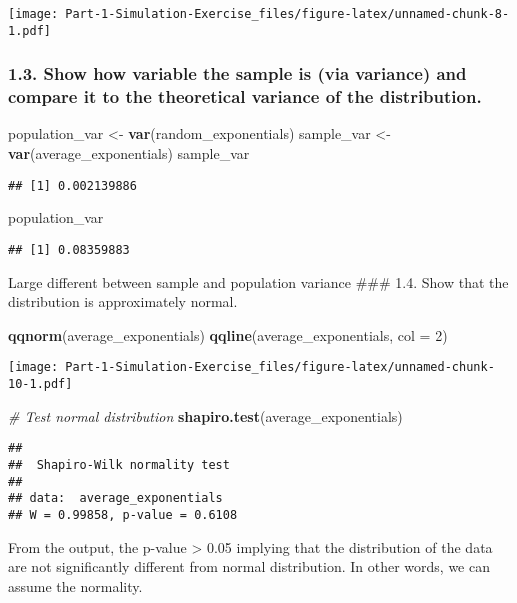 \documentclass[]{article}
\newenvironment{Shaded}{\begin{snugshade}}{\end{snugshade}}
\newcommand{\KeywordTok}[1]{\textcolor[rgb]{0.13,0.29,0.53}{\textbf{#1}}}
\newcommand{\DataTypeTok}[1]{\textcolor[rgb]{0.13,0.29,0.53}{#1}}
\newcommand{\DecValTok}[1]{\textcolor[rgb]{0.00,0.00,0.81}{#1}}
\newcommand{\StringTok}[1]{\textcolor[rgb]{0.31,0.60,0.02}{#1}}
\newcommand{\CommentTok}[1]{\textcolor[rgb]{0.56,0.35,0.01}{\textit{#1}}}
\newcommand{\NormalTok}[1]{#1}
\begin{document}
\texttt{[image: Part-1-Simulation-Exercise\_files/figure-latex/unnamed-chunk-8-1.pdf]}

\subsubsection{1.3. Show how variable the sample is (via variance) and
compare it to the theoretical variance of the
distribution.}\label{show-how-variable-the-sample-is-via-variance-and-compare-it-to-the-theoretical-variance-of-the-distribution.}

\begin{Shaded}
\begin{Highlighting}[]
\NormalTok{population_var <-}\StringTok{ }\KeywordTok{var}\NormalTok{(random_exponentials)}
\NormalTok{sample_var <-}\StringTok{ }\KeywordTok{var}\NormalTok{(average_exponentials)}
\NormalTok{sample_var}
\end{Highlighting}
\end{Shaded}

\begin{verbatim}
## [1] 0.002139886
\end{verbatim}

\begin{Shaded}
\begin{Highlighting}[]
\NormalTok{population_var}
\end{Highlighting}
\end{Shaded}

\begin{verbatim}
## [1] 0.08359883
\end{verbatim}

Large different between sample and population variance \#\#\# 1.4. Show
that the distribution is approximately normal.

\begin{Shaded}
\begin{Highlighting}[]
\KeywordTok{qqnorm}\NormalTok{(average_exponentials)}
\KeywordTok{qqline}\NormalTok{(average_exponentials, }\DataTypeTok{col =} \DecValTok{2}\NormalTok{)}
\end{Highlighting}
\end{Shaded}

\texttt{[image: Part-1-Simulation-Exercise\_files/figure-latex/unnamed-chunk-10-1.pdf]}

\begin{Shaded}
\begin{Highlighting}[]
\CommentTok{# Test normal distribution}
\KeywordTok{shapiro.test}\NormalTok{(average_exponentials)}
\end{Highlighting}
\end{Shaded}

\begin{verbatim}
## 
##  Shapiro-Wilk normality test
## 
## data:  average_exponentials
## W = 0.99858, p-value = 0.6108
\end{verbatim}

From the output, the p-value \textgreater{} 0.05 implying that the
distribution of the data are not significantly different from normal
distribution. In other words, we can assume the normality.
\end{document}

